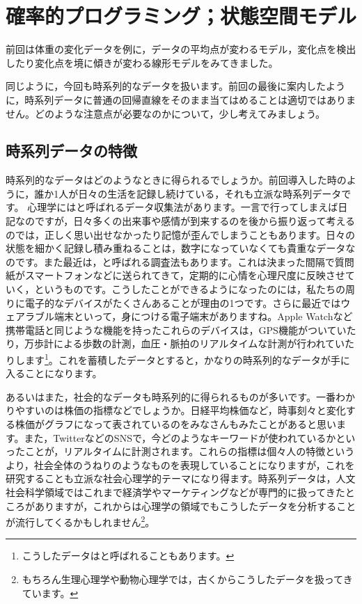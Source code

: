 \documentclass{ltjsbook}
\begin{document}
\chapter{確率的プログラミング；状態空間モデル}
\label{x29_SSpace}
前回は体重の変化データを例に，データの平均点が変わるモデル，変化点を検出したり変化点を境に傾きが変わる線形モデルをみてきました。

同じように，今回も時系列的なデータを扱います。前回の最後に案内したように，時系列データに普通の回帰直線をそのまま当てはめることは適切ではありません。どのような注意点が必要なのかについて，少し考えてみましょう。

\section{時系列データの特徴}
時系列的なデータはどのようなときに得られるでしょうか。前回導入した時のように，誰か1人が日々の生活を記録し続けている，それも立派な時系列データです。
心理学にはと呼ばれるデータ収集法があります。一言で行ってしまえば日記なのですが，日々多くの出来事や感情が到来するのを後から振り返って考えるのでは，正しく思い出せなかったり記憶が歪んでしまうこともあります。日々の状態を細かく記録し積み重ねることは，数字になっていなくても貴重なデータなのです。また最近は，と呼ばれる調査法もあります。これは決まった間隔で質問紙がスマートフォンなどに送られてきて，定期的に心情を心理尺度に反映させていく，というものです。こうしたことができるようになったのには，私たちの周りに電子的なデバイスがたくさんあることが理由の1つです。さらに最近ではウェアラブル端末といって，身につける電子端末がありますね。Apple Watchなど携帯電話と同じような機能を持ったこれらのデバイスは，GPS機能がついていたり，万歩計による歩数の計測，血圧・脈拍のリアルタイムな計測が行われていたりします\footnote{こうしたデータはと呼ばれることもあります。}。これを蓄積したデータとすると，かなりの時系列的なデータが手に入ることになります。

あるいはまた，社会的なデータも時系列的に得られるものが多いです。一番わかりやすいのは株価の指標などでしょうか。日経平均株価など，時事刻々と変化する株価がグラフになって表されているのをみなさんもみたことがあると思います。また，TwitterなどのSNSで，今どのようなキーワードが使われているかといったことが，リアルタイムに計測されます。これらの指標は個々人の特徴というより，社会全体のうねりのようなものを表現していることになりますが，これを研究することも立派な社会心理学的テーマになり得ます。時系列データは，人文社会科学領域ではこれまで経済学やマーケティングなどが専門的に扱ってきたところがありますが，これからは心理学の領域でもこうしたデータを分析することが流行してくるかもしれません\footnote{もちろん生理心理学や動物心理学では，古くからこうしたデータを扱ってきています。}。
\end{document}
